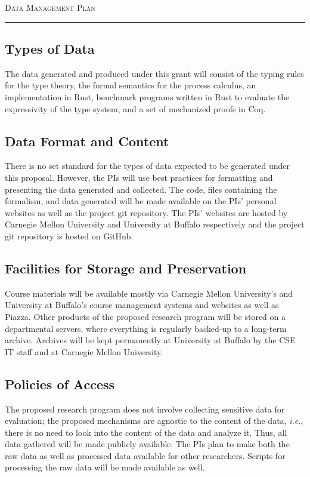 




\begin{center}
{\LARGE \textsc{Data Management Plan}}
\end{center}
\hrule

\vspace{3mm}

\subsection*{Types of Data}  
The data generated and produced under this grant will consist of the typing rules for the type theory, the formal semantics for the process calculus,
an implementation in Rust, benchmark programs written in Rust to evaluate the expressivity of the type system, and a set of mechanized proofs in Coq. 

\subsection*{Data Format and Content}
 There is no set standard for the types of data expected to be generated under this proposal. However, the PIs will use
best practices for formatting and presenting the data generated and collected. The code, files containing the
formalism,
and data generated will be made available on the PIs' personal websites as well as the
project git repository.  The PIs' websites are hosted by Carnegie Mellon University and University at Buffalo respectively and the project
git repository is hosted on GitHub.

\subsection*{Facilities for Storage and Preservation}
Course materials will be available mostly via Carnegie Mellon University's and University at Buffalo's course management systems and
websites as well as Piazza. Other  products of the proposed research program will be stored on a
departmental servers, where everything is regularly backed-up to a long-term
archive. Archives will be kept permanently at University at Buffalo by the CSE IT staff and at Carnegie Mellon University.

\subsection*{Policies of Access} 
The proposed research program does not involve collecting sensitive data for evaluation; the proposed mechanisms are agnostic to the content of the data, {\em i.e.}, there is no need to look into the content of the data and analyze it.  Thus, all data gathered will be made publicly available.  The PIs plan to make both the raw data as well as processed data available for other researchers. Scripts for processing the raw data will be made available as well. 



